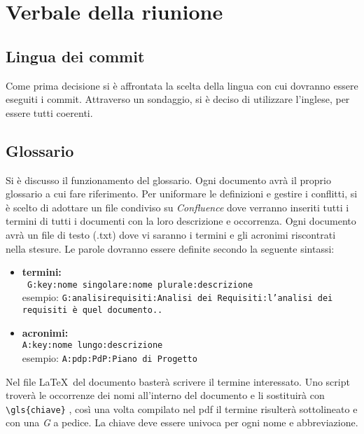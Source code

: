 \section{Verbale della riunione}
\subsection{Lingua dei commit}
Come prima decisione si è affrontata la scelta della lingua con cui dovranno essere eseguiti i commit. Attraverso un sondaggio, si è deciso di utilizzare l'inglese, per essere tutti coerenti.

\subsection{Glossario}
Si è discusso il funzionamento del glossario. Ogni documento avrà il proprio glossario a cui fare riferimento. 
Per uniformare le definizioni e gestire i conflitti, si è scelto di adottare un file condiviso su \textit{Confluence} dove verranno inseriti tutti i termini di tutti i documenti con la loro descrizione e occorrenza.
Ogni documento avrà un file di testo (.txt) dove vi saranno i termini e gli acronimi riscontrati nella stesure. Le parole dovranno essere definite secondo la seguente sintassi:
\begin{itemize}
\item \textbf{termini:}
	\\ \texttt{ G:key:nome singolare:nome plurale:descrizione}
	\\ esempio: \texttt{G:analisirequisiti:Analisi dei Requisiti:l'analisi dei requisiti è quel documento..}
\item \textbf{acronimi:}
	\\ 	\texttt{A:key:nome lungo:descrizione} 
	\\ esempio: \texttt{A:pdp:PdP:Piano di Progetto}
\end{itemize}
Nel file \LaTeX\ del documento basterà scrivere il termine interessato. Uno script troverà le occorrenze dei nomi all'interno del documento e li sostituirà con \texttt{\textbackslash gls\{chiave\}} , così una volta compilato nel pdf il termine risulterà sottolineato e con una \textit{G} a pedice.
La chiave deve essere univoca per ogni nome e abbreviazione.

